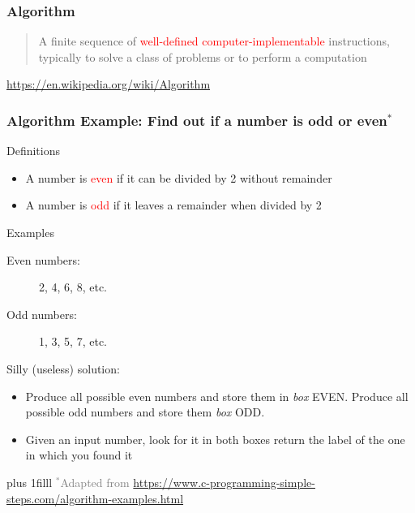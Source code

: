 \documentclass{beamer}
\newcommand{\btVFill}{\vskip0pt plus 1filll}
\newcommand{\light}[1]{\textcolor{gray}{#1}}
\newcommand{\red}[1]{\textcolor{red}{#1}}
\begin{document}
\begin{frame}
\frametitle{Algorithm}

\begin{quote}
 A finite sequence of \red{well-defined computer-implementable} instructions, 
typically to solve a class of problems or to perform a computation
\end{quote}
\begin{flushright}
\footnotesize
 \light{\url{https://en.wikipedia.org/wiki/Algorithm}}
\end{flushright}
\end{frame}

\begin{frame}
\frametitle{Algorithm Example: Find out if a number is odd or 
even$^*$}
\pause 

\alert{Definitions}

\begin{itemize}
 \item A number is \red{even} if it can be divided by 2 without remainder
 \item A number is \red{odd} if it leaves a remainder when divided by 2
\end{itemize}				\pause 

\alert{Examples}

\begin{description}
 \item[Even numbers:] 2, 4, 6, 8, etc. 
 \item[Odd numbers:] 1, 3, 5, 7, etc.
\end{description}			\pause 

\alert{Silly (useless) solution:}

\begin{itemize}
 \item Produce all possible even numbers and store them in \textit{box}  
EVEN\@. Produce all possible odd numbers and store them \textit{box} ODD\@. 
 \item Given an input number, look for it in both boxes return the label of 
the one in which you found it
\end{itemize}	

\btVFill
\onslide
\footnotesize
\light{$^*$Adapted from 
\url{https://www.c-programming-simple-steps.com/algorithm-examples.html}}
\end{frame}
\end{document}

